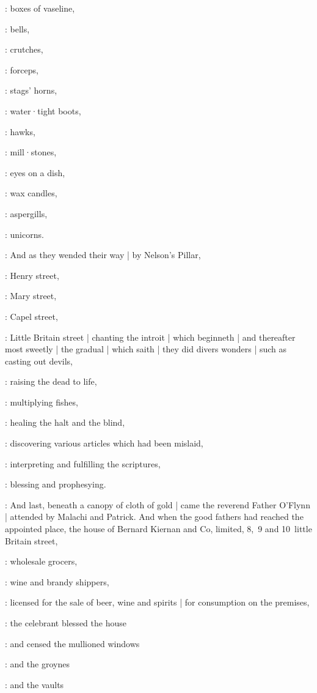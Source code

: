 :
boxes of vaseline,

:
bells,

:
crutches,

:
forceps,

:
stags' horns,

:
water·tight boots,

:
hawks,

:
mill·stones,

:
eyes on a dish,

:
wax candles,

:
aspergills,

:
unicorns.

:
And as they wended their way |
by Nelson's Pillar,

:
Henry street,

:
Mary street,

:
Capel street,

:
Little Britain street |
chanting the introit  |
which beginneth
 |
and thereafter most sweetly |
the gradual  |
which saith  |
they did divers wonders |
such as casting out devils,

:
raising the dead to life,

:
multiplying fishes,

:
healing the halt and the blind,

:
discovering various articles which had been mislaid,

:
interpreting and fulfilling the scriptures,

:
blessing and prophesying.

:
And last,
beneath a canopy of cloth of gold |
came the reverend Father O'Flynn |
attended by Malachi and Patrick.
And when the good fathers had reached the appointed place,
the house of Bernard Kiernan and Co,
limited,
8,~9 and 10~little Britain street,

:
wholesale grocers,

:
wine and brandy shippers,

:
licensed for the sale of beer,
wine and spirits |
for consumption on the premises,

:
the celebrant blessed the house

:
and censed the mullioned windows

:
and the groynes

:
and the vaults

